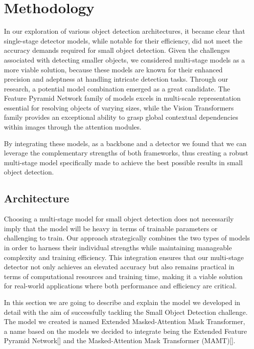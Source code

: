 \chapter{Methodology}

In our exploration of various object detection architectures, it became clear that single-stage detector models, while notable for their efficiency, did not 
meet the accuracy demands required for small object detection. Given the challenges associated with detecting smaller objects, we considered multi-stage models
as a more viable solution, because these models are known for their enhanced precision and adeptness at handling intricate detection tasks. Through our research, 
a potential model combination emerged as a great candidate. The Feature Pyramid Network family of models excels in multi-scale representation essential for 
resolving objects of varying sizes, while the Vision Transformers family provides an exceptional ability to grasp global contextual dependencies within images
through the attention modules. 

By integrating these models, as a backbone and a detector we found that we can leverage the complementary strengths of both frameworks, thus creating a 
robust multi-stage model specifically made to achieve the best possible results in small object detection.

\section{Architecture}

Choosing a multi-stage model for small object detection does not necessarily imply that the model will be heavy in terms of trainable parameters or challenging 
to train. Our approach strategically combines the two types of models in order to harness their individual strengths while maintaining manageable complexity 
and training efficiency. This integration ensures that our multi-stage detector not only achieves an elevated accuracy but also remains practical in terms of 
computational resources and training time, making it a viable solution for real-world applications where both performance and efficiency are critical.

In this section we are going to describe and explain the model we developed in detail with the aim of successfully tackling the Small Object Detection challenge. 
The model we created is named Extended Masked-Attention Mask Transformer, a name based on the models we decided to integrate being the Extended Feature Pyramid 
Network[] and the Masked-Attention Mask Transformer (MAMT)[].

